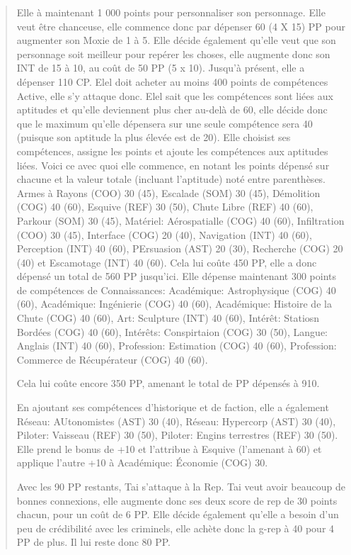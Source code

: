\begin{quotation}
Elle à maintenant 1 000 points pour personnaliser son personnage. Elle veut être chanceuse, elle commence donc par dépenser 60 (4 X 15) PP pour augmenter son Moxie de 1 à 5. Elle décide également qu'elle veut que son personnage soit meilleur pour repérer les choses, elle augmente donc son INT de 15 à 10, au coût de 50 PP (5 x 10). Jusqu'à présent, elle a dépenser 110 CP. Elel doit acheter au moins 400 points de compétences Active, elle s'y attaque donc. Elel sait que les compétences sont liées aux aptitudes et qu'elle deviennent plus cher au-delà de 60, elle décide donc que le maximum qu'elle dépensera sur une seule compétence sera 40 (puisque son aptitude la plus élevée est de 20). Elle choisist ses compétences, assigne les points et ajoute les compétences aux aptitudes liées. Voici ce avec quoi elle commence, en notant les points dépensé sur chacune et la valeur totale (incluant l'aptitude) noté entre parenthèses. Armes à Rayons (COO) 30 (45), Escalade (SOM) 30 (45), Démolition (COG) 40 (60), Esquive (REF) 30 (50), Chute Libre (REF) 40 (60), Parkour (SOM) 30 (45), Matériel: Aérospatialle (COG) 40 (60), Infiltration (COO) 30 (45), Interface (COG) 20 (40), Navigation (INT) 40 (60), Perception (INT) 40 (60), PErsuasion (AST) 20 (30), Recherche (COG) 20 (40) et Escamotage (INT) 40 (60). Cela lui coûte 450 PP, elle a donc dépensé un total de 560 PP jusqu'ici. Elle dépense maintenant 300 points de compétences de Connaissances: Académique: Astrophysique (COG) 40 (60), Académique: Ingénierie (COG) 40 (60), Académique: Histoire de la Chute (COG) 40 (60), Art: Sculpture (INT) 40 (60), Intérêt: Statiosn Bordées (COG) 40 (60), Intérêts: Conspirtaion (COG) 30 (50), Langue: Anglais (INT) 40 (60), Profession: Estimation (COG) 40 (60), Profession: Commerce de Récupérateur (COG) 40 (60). 

Cela lui coûte encore 350 PP, amenant le total de PP dépensés à 910. 

En ajoutant ses compétences d'historique et de faction, elle a également Réseau: AUtonomistes (AST) 30 (40), Réseau: Hypercorp (AST) 30 (40), Piloter: Vaisseau (REF) 30 (50), Piloter: Engins terrestres (REF) 30 (50). Elle prend le bonus de +10 et l'attribue à Esquive (l'amenant à 60) et applique l'autre +10 à Académique: Économie (COG) 30. 

Avec les 90 PP restants, Tai s'attaque à la Rep. Tai veut avoir beaucoup de bonnes connexions, elle augmente donc ses deux score de rep de 30 points chacun, pour un coût de 6 PP. Elle décide également qu'elle a besoin d'un peu de crédibilité avec les criminels, elle achète donc la g-rep à 40 pour 4 PP de plus. Il lui reste donc 80 PP. 


\end{quotation}
